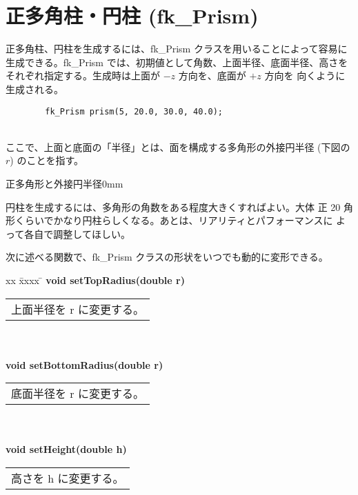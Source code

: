 \section{正多角柱・円柱 (fk\_Prism)}
正多角柱、円柱を生成するには、fk\_Prism クラスを用いることによって容易に
生成できる。fk\_Prism では、初期値として角数、上面半径、底面半径、高さを
それぞれ指定する。生成時は上面が \(-z\) 方向を、底面が \(+z\) 方向を
向くように生成される。
\\
\begin{screen}
\begin{verbatim}
        fk_Prism prism(5, 20.0, 30.0, 40.0);
\end{verbatim}
\end{screen}
~ \\
ここで、上面と底面の「半径」とは、面を構成する多角形の外接円半径
(下図の \(r\)) のことを指す。

	{正多角形と外接円半径}{0mm}

円柱を生成するには、多角形の角数をある程度大きくすればよい。大体
正 20 角形くらいでかなり円柱らしくなる。あとは、リアリティとパフォーマンスに
よって各自で調整してほしい。

次に述べる関数で、fk\_Prism クラスの形状をいつでも動的に変形できる。
\begin{tabbing}
xx \= xxxx \= \kill
\> \textbf{void setTopRadius(double r)} \\
	\> \> \begin{tabular}{p{15cm}}
		上面半径を r に変更する。
	\end{tabular} \\ \\

\> \textbf{void setBottomRadius(double r)} \\
	\> \> \begin{tabular}{p{15cm}}
		底面半径を r に変更する。
	\end{tabular} \\ \\

\> \textbf{void setHeight(double h)} \\
	\> \> \begin{tabular}{p{15cm}}
		高さを h に変更する。
	\end{tabular}
\end{tabbing}

